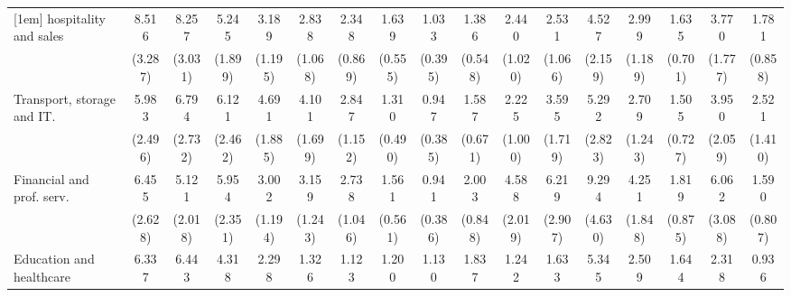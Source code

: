 {\begin{tabular}{l*{16}{c}}
[1em]
hospitality and sales&       8.516\sym{***}&       8.257\sym{***}&       5.245\sym{***}&       3.189\sym{**} &       2.838\sym{**} &       2.348\sym{*}  &       1.639         &       1.033         &       1.386         &       2.440\sym{*}  &       2.531\sym{*}  &       4.527\sym{**} &       2.999\sym{**} &       1.635         &       3.770\sym{**} &       1.781         \\
                    &     (3.287)         &     (3.031)         &     (1.899)         &     (1.195)         &     (1.068)         &     (0.869)         &     (0.555)         &     (0.395)         &     (0.548)         &     (1.020)         &     (1.066)         &     (2.159)         &     (1.189)         &     (0.701)         &     (1.777)         &     (0.858)         \\
[1em]
Transport, storage and IT.&       5.983\sym{***}&       6.794\sym{***}&       6.121\sym{***}&       4.691\sym{***}&       4.101\sym{***}&       2.847\sym{**} &       1.310         &       0.947         &       1.587         &       2.225         &       3.595\sym{**} &       5.292\sym{**} &       2.709\sym{*}  &       1.505         &       3.950\sym{**} &       2.521         \\
                    &     (2.496)         &     (2.732)         &     (2.462)         &     (1.885)         &     (1.699)         &     (1.152)         &     (0.490)         &     (0.385)         &     (0.671)         &     (1.000)         &     (1.719)         &     (2.823)         &     (1.243)         &     (0.727)         &     (2.059)         &     (1.410)         \\
[1em]
Financial and prof. serv.&       6.455\sym{***}&       5.121\sym{***}&       5.954\sym{***}&       3.002\sym{**} &       3.159\sym{**} &       2.738\sym{**} &       1.561         &       0.941         &       2.003         &       4.588\sym{***}&       6.219\sym{***}&       9.294\sym{***}&       4.251\sym{***}&       1.819         &       6.062\sym{***}&       1.590         \\
                    &     (2.628)         &     (2.018)         &     (2.351)         &     (1.194)         &     (1.243)         &     (1.046)         &     (0.561)         &     (0.386)         &     (0.848)         &     (2.019)         &     (2.907)         &     (4.630)         &     (1.848)         &     (0.875)         &     (3.088)         &     (0.807)         \\
[1em]
Education and healthcare&       6.337\sym{***}&       6.443\sym{***}&       4.318\sym{**} &       2.298         &       1.326         &       1.123         &       1.200         &       1.130         &       1.837         &       1.242         &       1.633         &       5.345\sym{**} &       2.509         &       1.644         &       2.318         &       0.936         \\

\end{tabular}}
